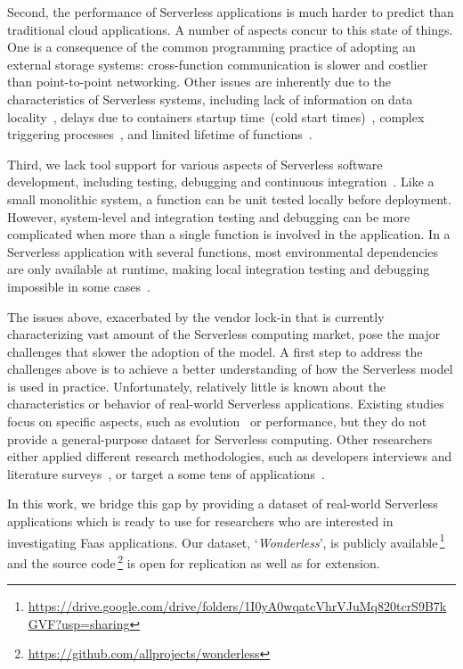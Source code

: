 Second, the performance of Serverless applications is much harder to 
predict than traditional cloud applications. A number of aspects concur 
to this state of things.
One is a consequence of the common programming practice
of adopting an external storage systems: cross-function communication 
is slower and costlier than point-to-point networking.
Other issues are inherently due to the characteristics of Serverless systems,
including lack of information on data locality~\cite{DBLP:journals/corr/abs-1902-03383},
delays due to containers startup time~(cold start times)~\cite{manner2018cold}, 
complex triggering processes~\cite{pelle2019towards}, and
limited lifetime of functions~\cite{hellerstein2018serverless}.

Third, we lack tool support for various aspects of
Serverless software development, including testing, debugging 
and continuous integration~\cite{lenarduzzi2020serverless, nupponen2020serverless}.
Like a small monolithic system, a function can be unit tested 
locally before deployment. 
However, system-level and integration testing and debugging can 
be more complicated when more than a single function is involved 
in the application. In a Serverless application with several functions, 
most environmental dependencies are only available at runtime, 
making local integration testing and debugging impossible in 
some cases~\cite{leitner2019mixed}.


The issues above, exacerbated by the vendor lock-in that is currently 
characterizing vast amount of the Serverless computing market, 
pose the major challenges that slower the adoption of the \faas model. 
A first step to address the challenges above is to achieve a 
better understanding of how the Serverless model is used in practice. 
Unfortunately, relatively little is known about the characteristics 
or behavior of real-world Serverless applications. Existing studies focus 
on specific aspects, such as evolution~\cite{spillner2019quantitative} 
or performance\cite{wang2018peeking,lloyd2018serverless},
but they do not provide a general-purpose dataset for Serverless computing.
Other researchers either applied different research methodologies, 
such as developers interviews and literature surveys~\cite{leitner2019mixed},
or target a some tens of applications~\cite{eismann2020serverless}.


In this work, we bridge this gap by providing a dataset of real-world Serverless 
applications which is ready to use for researchers who are interested in investigating
Faas applications. Our dataset, `\emph{Wonderless}', is publicly 
available\,\footnote{\url{https://drive.google.com/drive/folders/1I0yA0wqatcVhrVJuMq820tcrS9B7kGVF?usp=sharing}} 
and the source code\,\footnote{\url{https://github.com/allprojects/wonderless}} 
is open for replication as well as for extension.











